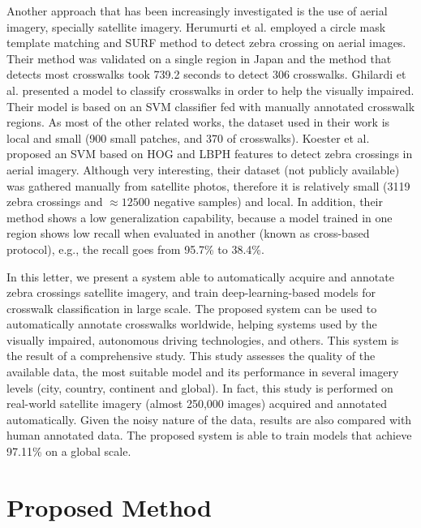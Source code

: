 \documentclass[journal]{IEEEtran}
\begin{document}
Another approach that has been increasingly investigated is the use of aerial imagery, specially satellite imagery. Herumurti et al. \cite{herumurti2013urban} employed a circle mask template matching and SURF method to detect zebra crossing on aerial images. Their method was validated on a single region in Japan and the method that detects most crosswalks took 739.2 seconds to detect 306 crosswalks. Ghilardi et al. \cite{ghilardi2016crosswalk} presented a model to classify crosswalks in order to help the visually impaired. Their model is based on an SVM classifier fed with manually annotated crosswalk regions. As most of the other related works, the dataset used in their work is local and small (900 small patches, and 370 of crosswalks). Koester et al. \cite{koester2016zebra} proposed an SVM based on HOG and LBPH features to detect zebra crossings in aerial imagery. Although very interesting, their dataset (not publicly available) was gathered manually from satellite photos, therefore it is relatively small (3119 zebra crossings and $\approx12500$ negative samples) and local. In addition, their method shows a low generalization capability, because a model trained in one region shows low recall when evaluated in another (known as cross-based protocol), e.g., the recall goes from 95.7\% to 38.4\%.

In this letter, we present a system able to automatically acquire and annotate zebra crossings satellite imagery, and train deep-learning-based models for crosswalk classification in large scale. The proposed system can be used to automatically annotate crosswalks worldwide, helping systems used by the visually impaired, autonomous driving technologies, and others. This system is the result of a comprehensive study. This study assesses the quality of the available data, the most suitable model and its performance in several imagery levels (city, country, continent and global). In fact, this study is performed on real-world satellite imagery (almost 250,000 images) acquired and annotated automatically. Given the noisy nature of the data, results are also compared with human annotated data. The proposed system is able to train models that achieve 97.11\% on a global scale.


\section{Proposed Method}
\end{document}
